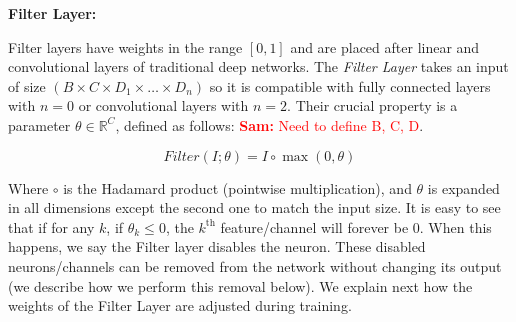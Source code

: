 \documentclass[sigconf]{acmart}
\newcommand{\srm}[1]{\textcolor{red}{{\bf Sam:} #1}}
\begin{document}
%
%
%


\textbf{Filter Layer: } 

Filter layers have weights in the range $[0,1]$ and are placed after linear and
convolutional layers of traditional deep networks. The \textit{Filter Layer}
takes an input of size $\left(B \times C \times D_1 \times \dots \times
D_n\right)$ so it is compatible with fully connected layers with $n=0$ or
convolutional layers with $n=2$. Their crucial property is a parameter $\theta \in
\mathbb{R}^C$, defined as follows: \srm{Need to define B, C, D}.  

\begin{equation} 
Filter(I;\theta) = I \circ \max(0, \theta)
\end{equation}

Where $\circ$ is the Hadamard product (pointwise multiplication), and $\theta$
is expanded in all dimensions except the second one to match the input size. It
is easy to see that if for any $k$, if $\theta_k \leq 0$, the $k^{\text{th}}$
feature/channel will forever be $0$. When this happens, we say the Filter layer
disables the neuron. These disabled neurons/channels can be removed from the
network without changing its output (we describe how we perform this removal
below). We explain next how the weights of the Filter Layer are
adjusted during training. 
\end{document}
